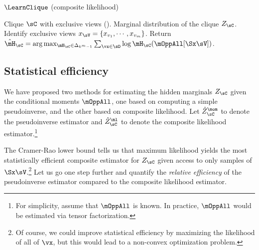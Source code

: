 \begin{algorithm}
  \caption{$\LearnClique$ (composite likelihood)}
  \label{algo:piecewise}
  \begin{algorithmic}
    \REQUIRE Clique $\sC$ with exclusive views ().
    \ENSURE Marginal distribution of the clique $Z_\sC$.
\STATE Identify exclusive views $x_\sV = \{x_{v_1}, \cdots, x_{v_m}\}$.
\STATE Return $\hat \mH_\sC = \arg\max_{\mH_\sC \in \Delta_{k^m-1}} \sum_{\vx \in \sD} \log \mH_\sC(\mOppAll[\Sx \sV])$.
  \end{algorithmic}
\end{algorithm}

\subsection{Statistical efficiency}

We have proposed two methods for estimating the hidden marginals $Z_\sC$ given
the conditional moments $\mOppAll$, one based on computing a simple pseudoinverse,
and the other based on composite likelihood.
Let $\hat Z^\mom_\sC$ to denote the pseudoinverse estimator and $\hat
  Z^\ml_\sC$ to denote the composite likelihood estimator.\footnote{For simplicity, assume that $\mOppAll$ is known.
  In practice, $\mOppAll$ would be estimated via tensor factorization.}

The Cramer-Rao lower bound tells us that maximum likelihood yields the
  most statistically efficient composite estimator for $Z_\sC$ given
  access to only samples of $\Sx\sV$.\footnote{Of course, we could improve
  statistical efficiency by maximizing the likelihood of all of $\vx$, but
  this would lead to a non-convex optimization problem.}
Let us go one step further and quantify the \emph{relative efficiency} of the pseudoinverse
  estimator compared to the composite likelihood estimator.


